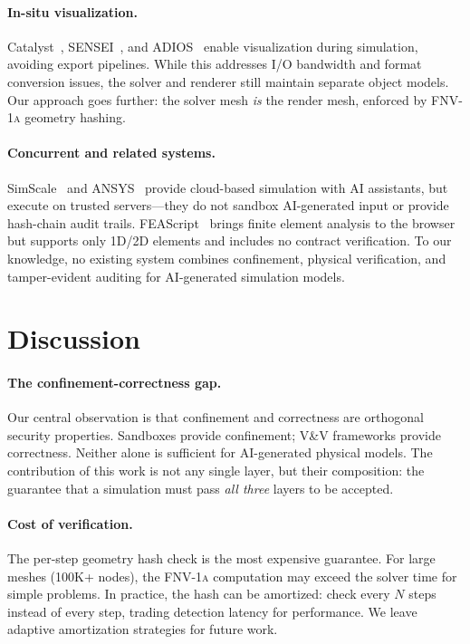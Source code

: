\documentclass[letterpaper,twocolumn,10pt]{article}
\newcommand{\fnvhash}{\textsc{FNV-1a}}
\begin{document}
\paragraph{In-situ visualization.}
Catalyst~\cite{ayachit2015catalyst}, SENSEI~\cite{ayachit2016sensei},
and ADIOS~\cite{godoy2020adios} enable visualization during
simulation, avoiding export pipelines. While this addresses I/O
bandwidth and format conversion issues, the solver and renderer
still maintain separate object models. Our approach goes further:
the solver mesh \emph{is} the render mesh, enforced by
\fnvhash{} geometry hashing.

\paragraph{Concurrent and related systems.}
SimScale~\cite{simscale2025} and ANSYS~\cite{ansys2025ai} provide
cloud-based simulation with AI assistants, but execute on trusted
servers---they do not sandbox AI-generated input or provide
hash-chain audit trails. FEAScript~\cite{feascript2025} brings
finite element analysis to the browser but supports only 1D/2D
elements and includes no contract verification. To our knowledge,
no existing system combines confinement, physical verification,
and tamper-evident auditing for AI-generated simulation models.


\section{Discussion}
\label{sec:discussion}

\paragraph{The confinement-correctness gap.}
Our central observation is that confinement and correctness are
orthogonal security properties. Sandboxes provide confinement;
V\&V frameworks provide correctness. Neither alone is sufficient
for AI-generated physical models. The contribution of this work
is not any single layer, but their composition: the guarantee
that a simulation must pass \emph{all three} layers to be accepted.

\paragraph{Cost of verification.}
The per-step geometry hash check is the most expensive guarantee.
For large meshes (100K+ nodes), the \fnvhash{} computation may
exceed the solver time for simple problems. In practice, the
hash can be amortized: check every $N$ steps instead of every step,
trading detection latency for performance. We leave adaptive
amortization strategies for future work.
\end{document}
